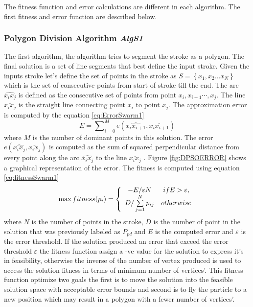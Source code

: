 The fitness function and error calculations are different in each algorithm. The first fitness and error function are described below. 


\subsubsection{Polygon Division Algorithm \textsl{AlgS1}}
\label{sec:PolygonDivisionAlgorithm}
The first algorithm, the algorithm tries to segment the stroke as a polygon. The final solution is a set of line segments that best define the input stroke. Given the inputs stroke let's define the set of points in the stroke as  $S = \left\{ {x_1 ,x_2  \ldots x_N } \right\}$ which is the set of consecutive points from start of stroke till the end. The arc $\widehat{x_ix_j}$ is defined as the consecutive set of points from point $x_i,x_{i+1} \cdots,x_j$. The line
$\overline{x_i x_j} $ is the straight line connecting point $x_i$ to point $x_j$. The approximation error is computed by the equation \ref{eq:ErrorSwarm1} 
\begin{equation}
E=\sum\nolimits_{i = 0}^M e ( \widehat{x_ix_{i+1}},\overline{x_i x_{i+1}})
\label{eq:ErrorSwarm1}
\end{equation}
 where $M$ is the number of dominant points in this solution.  The error $ e ( \widehat{x_ix_j},\overline{x_i x_j})$ is computed as the sum of squared perpendicular distance from every point along the arc $\widehat{x_ix_j}$ to the line $\overline{x_i x_j}$ \cite{PolygonApproximationPSO}. Figure \ref{fig:DPSOERROR} shows a graphical representation of the error. The fitness is computed using equation \ref{eq:fitnessSwarm1} 
\begin{equation}
\max fitness(p_i ) = \left\{ {\begin{array}{*{20}c}
   { - E/\varepsilon N} & {ifE > \varepsilon ,}  \\
   {D/\sum\limits_{j = 1}^N {p_{ij} } } & {otherwise}  \\
\end{array}} \right.
\label{eq:fitnessSwarm1}
\end{equation}%
where $N$ is the number of points in the stroke, $D$ is the number of point in the solution that was previously labeled as $P_{pd}$  and $E$ is the computed error and $\varepsilon$ is the error threshold.  If the solution produced an error that exceed the error threshold $\varepsilon$ the fitness function assign a -ve value for the solution to express it's in feasibility, otherwise the inverse of the number of vertex produced is used to access the solution fitness in terms of minimum number of vertices'.  This fitness function optimize two goals the first is to move the solution into the feasible solution space with acceptable error bounds and second is to fly the particle to a new position which may result in a polygon with a fewer number of vertices'\cite{PolygonApproximationPSO}. 
